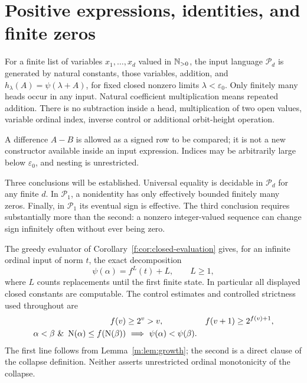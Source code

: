 \section{Positive expressions, identities, and finite zeros}
\label{u:sec:positive}

\begin{definition}\label{u:def:positive}
For a finite list of variables $x_1,\ldots,x_d$ valued in $\mathbb N_{>0}$, the input
language $\mathcal P_d$ is generated by natural constants, those variables,
addition, and $h_\lambda(A)=\psi(\lambda+A)$, for fixed closed nonzero limits
$\lambda<\varepsilon_0$. Only finitely many heads occur in any input.
Natural coefficient multiplication means repeated addition. There is no
subtraction inside a head, multiplication of two open values, variable
ordinal index, inverse control or additional orbit-height operation.
\end{definition}
A difference $A-B$ is allowed as a signed row to be compared; it is not a
new constructor available inside an input expression. Indices may be
arbitrarily large below $\varepsilon_0$, and nesting is unrestricted.

Three conclusions will be established. Universal equality is decidable in
$\mathcal P_d$ for any finite $d$. In $\mathcal P_1$, a nonidentity has only
effectively bounded finitely many zeros. Finally, in $\mathcal P_1$ its
eventual sign is effective. The third conclusion requires substantially
more than the second: a nonzero integer-valued sequence can change sign
infinitely often without ever being zero.


The greedy evaluator of Corollary~\ref{f:cor:closed-evaluation} gives,
for an infinite ordinal input of norm $t$, the exact decomposition
\begin{equation}
  \psi(\alpha)=f^L(t)+L,\qquad L\ge1,                 \label{u:display:1-3}
\end{equation}
where $L$ counts replacements until the first finite state.  In particular
all displayed closed constants are computable.  The control estimates and
controlled strictness used throughout are
\begin{align}
 f(v)&\ge2^v>v,& f(v+1)&\ge2^{f(v)+1}, \label{u:eq:gaps}\\
 \alpha<\beta\ \&\ \operatorname{N}(\alpha)\le f(\operatorname{N}(\beta))
 &\ \Longrightarrow\ \psi(\alpha)<\psi(\beta).
 \label{u:eq:strict}
\end{align}
The first line follows from Lemma~\ref{m:lem:growth}; the second is a
direct clause of the collapse definition.  Neither asserts unrestricted
ordinal monotonicity of the collapse.

